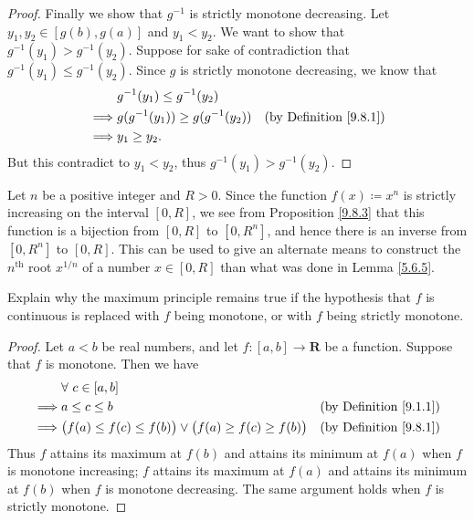 \begin{proof}
    Finally we show that \(g^{-1}\) is strictly monotone decreasing.
    Let \(y_1, y_2 \in [g(b), g(a)]\) and \(y_1 < y_2\).
    We want to show that \(g^{-1}(y_1) > g^{-1}(y_2)\).
    Suppose for sake of contradiction that \(g^{-1}(y_1) \leq g^{-1}(y_2)\).
    Since \(g\) is strictly monotone decreasing, we know that
    \begin{align*}
        & g^{-1}(y_1) \leq g^{-1}(y_2) \\
        \implies & g(g^{-1}(y_1)) \geq g(g^{-1}(y_2)) & \text{(by Definition \ref{9.8.1})} \\
        \implies & y_1 \geq y_2.
    \end{align*}
    But this contradict to \(y_1 < y_2\), thus \(g^{-1}(y_1) > g^{-1}(y_2)\).
\end{proof}

\begin{example}\label{9.8.4}
    Let \(n\) be a positive integer and \(R > 0\).
    Since the function \(f(x) \coloneqq x^n\) is strictly increasing on the interval \([0, R]\), we see from Proposition \ref{9.8.3} that this function is a bijection from \([0, R]\) to \([0, R^n]\), and hence there is an inverse from \([0, R^n]\) to \([0, R]\).
    This can be used to give an alternate means to construct the \(n^\text{th}\) root \(x^{1 / n}\) of a number \(x \in [0, R]\) than what was done in Lemma \ref{5.6.5}.
\end{example}

\exercisesection

\begin{exercise}\label{ex 9.8.1}
    Explain why the maximum principle remains true if the hypothesis that \(f\) is continuous is replaced with \(f\) being monotone, or with \(f\) being strictly monotone.
\end{exercise}

\begin{proof}
    Let \(a < b\) be real numbers, and let \(f : [a, b] \to \mathbf{R}\) be a function.
    Suppose that \(f\) is monotone.
    Then we have
    \begin{align*}
        & \forall\ c \in [a, b] \\
        \implies & a \leq c \leq b & \text{(by Definition \ref{9.1.1})} \\
        \implies & \big(f(a) \leq f(c) \leq f(b)\big) \lor \big(f(a) \geq f(c) \geq f(b)\big) & \text{(by Definition \ref{9.8.1})} \\
    \end{align*}
    Thus \(f\) attains its maximum at \(f(b)\) and attains its minimum at \(f(a)\) when \(f\) is monotone increasing;
    \(f\) attains its maximum at \(f(a)\) and attains its minimum at \(f(b)\) when \(f\) is monotone decreasing.
    The same argument holds when \(f\) is strictly monotone.
\end{proof}

